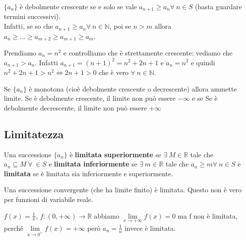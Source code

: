 \begin{observation}
$\{a_n\}$ è debolmente crescente se e solo se vale $a_{n+1} \geq a_n \forall \: n \in S$ (basta guardare termini successivi).\\
Infatti, se so che $a_{n+1} \geq a_n \forall \: n \in \mathbb{N}$, poi se $n > m$ allora $a_n \geq ... \geq a_{m+2} \geq a_{m+1} \geq a_{m}$.
\end{observation}

\begin{example}
Prendiamo $a_n=n^2$ e controlliamo che è strettamente crescente: vediamo che $a_{n+1} > a_n$. Infatti $a_{n+1} = (n+1)^2 = n^2 + 2n + 1$ e $a_n = n^2$ e quindi $n^2 + 2n + 1 > n^2 \Longleftrightarrow 2n+1 > 0$ che è vero $\forall \:n \in \mathbb{N}$.
\end{example}

\begin{theorem}
Se $\{a_n\}$ è monotona (cioè debolmente crescente o decrescente) allora ammette limite.
Se è debolmente crescente, il limite non può essere $-\infty$ e se Se è debolmente decrescente, il limite non può essere $+\infty$
\end{theorem}

\subsection{Limitatezza}
\begin{definition}[Limitatezza]
Una successione $\{a_n\}$ è \textbf{limitata superiormente} se $\exists\: M \in \mathbb{R}$ tale che $a_n \subseteq M \:\forall\: \in S$ e \textbf{limitata inferiormente} se $\exists \:m \in \mathbb{R}$ tale che $a_n \geq m \forall \: n \in S$ e \textbf{limitata} se è limitata sia inferiormente e superiormente.
\end{definition}

\begin{observation}
Una successione convergente (che ha limite finito) è limitata. Questo non è vero per funzioni di variabile reale.
\end{observation}

\begin{example}
$f(x) = \frac{1}{x}$, $f: (0,+\infty)\to \mathbb{R}$ abbiamo $\lim\limits_{x\to +\infty}f(x) = 0$ ma f non è limitata, perché $\lim\limits_{x\to 0^+}f(x) = +\infty$ però $a_n = \frac{1}{n}$ invece è limitata.
\end{example}

